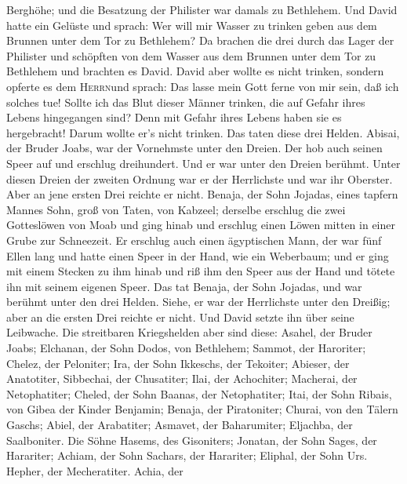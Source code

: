 Berghöhe; und die Besatzung der Philister war damals zu Bethlehem.
 Und David hatte ein Gelüste und sprach: Wer will mir
Wasser zu trinken geben aus dem Brunnen unter dem Tor zu Bethlehem?
 Da brachen die drei durch das Lager der Philister und
schöpften von dem Wasser aus dem Brunnen unter dem Tor zu Bethlehem und
brachten es David. David aber wollte es nicht trinken, sondern opferte
es dem \textsc{Herrn}und sprach:  Das lasse mein Gott
ferne von mir sein, daß ich solches tue! Sollte ich das Blut dieser
Männer trinken, die auf Gefahr ihres Lebens hingegangen sind? Denn mit
Gefahr ihres Lebens haben sie es hergebracht! Darum wollte er's nicht
trinken. Das taten diese drei Helden.  Abisai, der Bruder
Joabs, war der Vornehmste unter den Dreien. Der hob auch seinen Speer
auf und erschlug dreihundert. Und er war unter den Dreien berühmt.
 Unter diesen Dreien der zweiten Ordnung war er der
Herrlichste und war ihr Oberster. Aber an jene ersten Drei reichte er
nicht.  Benaja, der Sohn Jojadas, eines tapfern Mannes
Sohn, groß von Taten, von Kabzeel; derselbe erschlug die zwei
Gotteslöwen von Moab und ging hinab und erschlug einen Löwen mitten in
einer Grube zur Schneezeit.  Er erschlug auch einen
ägyptischen Mann, der war fünf Ellen lang und hatte einen Speer in der
Hand, wie ein Weberbaum; und er ging mit einem Stecken zu ihm hinab und
riß ihm den Speer aus der Hand und tötete ihn mit seinem eigenen Speer.
 Das tat Benaja, der Sohn Jojadas, und war berühmt unter
den drei Helden.  Siehe, er war der Herrlichste unter den
Dreißig; aber an die ersten Drei reichte er nicht. Und David setzte ihn
über seine Leibwache.  Die streitbaren Kriegshelden aber
sind diese: Asahel, der Bruder Joabs; Elchanan, der Sohn Dodos, von
Bethlehem;  Sammot, der Haroriter; Chelez, der Peloniter;
 Ira, der Sohn Ikkeschs, der Tekoiter; Abieser, der
Anatotiter,  Sibbechai, der Chusatiter; Ilai, der
Achochiter;  Macherai, der Netophatiter; Cheled, der Sohn
Baanas, der Netophatiter;  Itai, der Sohn Ribais, von
Gibea der Kinder Benjamin; Benaja, der Piratoniter; 
Churai, von den Tälern Gaschs; Abiel, der Arabatiter; 
Asmavet, der Baharumiter; Eljachba, der Saalboniter.  Die
Söhne Hasems, des Gisoniters; Jonatan, der Sohn Sages, der Harariter;
 Achiam, der Sohn Sachars, der Harariter; Eliphal, der
Sohn Urs.  Hepher, der Mecheratiter. Achia, der
